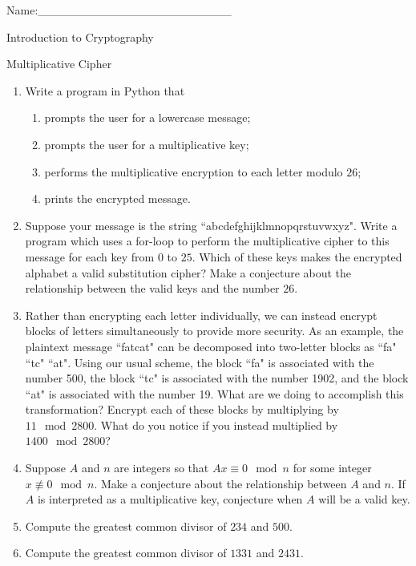 \documentclass[12pt]{amsart}
\theoremstyle{definition}
\theoremstyle{remark}
\numberwithin{equation}{section}
\begin{document}
\begin{flushright}
Name:\_\_\_\_\_\_\_\_\_\_\_\_\_\_\_\_\_\_\_\_\_\_\_
\end{flushright}
\vspace{10pt}
\begin{center}
Introduction to Cryptography

Multiplicative Cipher
\end{center}


\begin{enumerate}
\item Write a program in Python that 
\begin{enumerate}
\item prompts the user for a lowercase message;
\item prompts the user for a multiplicative key;
\item performs the multiplicative encryption to each letter modulo $26$;
\item prints the encrypted message.
\end{enumerate}
\item Suppose your message is the string ``abcdefghijklmnopqrstuvwxyz". Write a program which uses a for-loop to perform the multiplicative cipher to this message for each key from $0$ to $25$. Which of these keys makes the encrypted alphabet a valid substitution cipher? Make a conjecture about the relationship between the valid keys and the number $26$.
\item Rather than encrypting each letter individually, we can instead encrypt blocks of letters simultaneously to provide more security. As an example, the plaintext message ``fatcat" can be decomposed into two-letter blocks as ``fa" ``tc" ``at". Using our usual scheme, the block ``fa" is associated with the number 500, the block ``tc" is associated with the number 1902, and the block ``at" is associated with the number 19. What are we doing to accomplish this transformation? Encrypt each of these blocks by multiplying by $11\mod 2800$. What do you notice if you instead multiplied by $1400\mod 2800$? 
\item Suppose $A$ and $n$ are integers so that $Ax\equiv 0\mod n$ for some integer $x\not\equiv 0\mod n$. Make a conjecture about the relationship between $A$ and $n$. If $A$ is interpreted as a multiplicative key, conjecture when $A$ will be a valid key.
\item Compute the greatest common divisor of $234$ and $500$.
\item Compute the greatest common divisor of $1331$ and $2431$.
\end{enumerate}
\vfill
\end{document}
